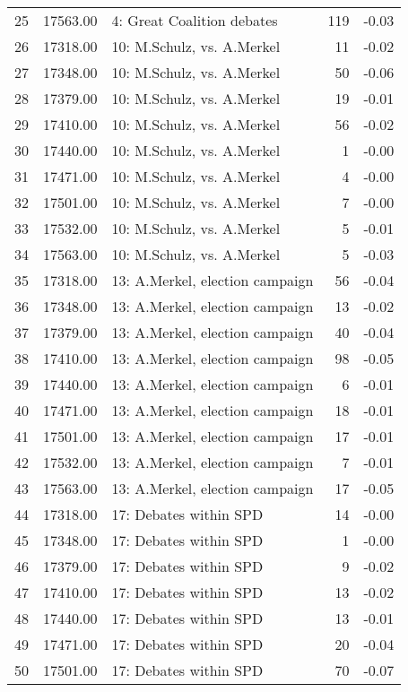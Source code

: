 \begin{table}[ht]
\begin{tabular}{rrlrr}
  25 & 17563.00 & 4: Great Coalition debates & 119 & -0.03 \\ 
  26 & 17318.00 & 10: M.Schulz, vs. A.Merkel &  11 & -0.02 \\ 
  27 & 17348.00 & 10: M.Schulz, vs. A.Merkel &  50 & -0.06 \\ 
  28 & 17379.00 & 10: M.Schulz, vs. A.Merkel &  19 & -0.01 \\ 
  29 & 17410.00 & 10: M.Schulz, vs. A.Merkel &  56 & -0.02 \\ 
  30 & 17440.00 & 10: M.Schulz, vs. A.Merkel &   1 & -0.00 \\ 
  31 & 17471.00 & 10: M.Schulz, vs. A.Merkel &   4 & -0.00 \\ 
  32 & 17501.00 & 10: M.Schulz, vs. A.Merkel &   7 & -0.00 \\ 
  33 & 17532.00 & 10: M.Schulz, vs. A.Merkel &   5 & -0.01 \\ 
  34 & 17563.00 & 10: M.Schulz, vs. A.Merkel &   5 & -0.03 \\ 
  35 & 17318.00 & 13: A.Merkel, election campaign &  56 & -0.04 \\ 
  36 & 17348.00 & 13: A.Merkel, election campaign &  13 & -0.02 \\ 
  37 & 17379.00 & 13: A.Merkel, election campaign &  40 & -0.04 \\ 
  38 & 17410.00 & 13: A.Merkel, election campaign &  98 & -0.05 \\ 
  39 & 17440.00 & 13: A.Merkel, election campaign &   6 & -0.01 \\ 
  40 & 17471.00 & 13: A.Merkel, election campaign &  18 & -0.01 \\ 
  41 & 17501.00 & 13: A.Merkel, election campaign &  17 & -0.01 \\ 
  42 & 17532.00 & 13: A.Merkel, election campaign &   7 & -0.01 \\ 
  43 & 17563.00 & 13: A.Merkel, election campaign &  17 & -0.05 \\ 
  44 & 17318.00 & 17: Debates within SPD &  14 & -0.00 \\ 
  45 & 17348.00 & 17: Debates within SPD &   1 & -0.00 \\ 
  46 & 17379.00 & 17: Debates within SPD &   9 & -0.02 \\ 
  47 & 17410.00 & 17: Debates within SPD &  13 & -0.02 \\ 
  48 & 17440.00 & 17: Debates within SPD &  13 & -0.01 \\ 
  49 & 17471.00 & 17: Debates within SPD &  20 & -0.04 \\ 
  50 & 17501.00 & 17: Debates within SPD &  70 & -0.07 \\ 

\end{tabular}
\end{table}
